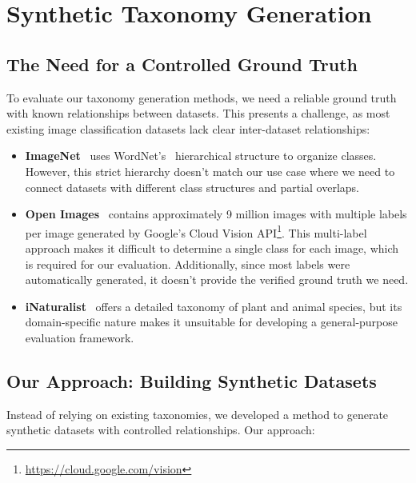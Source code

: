 \section{Synthetic Taxonomy Generation}

\subsection{The Need for a Controlled Ground Truth}

To evaluate our taxonomy generation methods, we need a reliable ground truth with known relationships between datasets. This presents a challenge, as most existing image classification datasets lack clear inter-dataset relationships:

\begin{itemize}
    \item \textbf{ImageNet}~\cite{deng_imagenet_2009,russakovsky_imagenet_2015}
          uses WordNet's~\cite{fellbaum_wordnet_1998} hierarchical structure to organize classes.
          However, this strict hierarchy doesn't match our use case where we need to connect
          datasets with different class structures and partial overlaps.

    \item \textbf{Open Images}~\cite{kuznetsova_open_2020} contains approximately 9 million
          images with multiple labels per image generated by Google's Cloud Vision API\footnote{\url{https://cloud.google.com/vision}}.
          This multi-label approach makes it difficult to determine a single class for each image,
          which is required for our evaluation. Additionally, since most labels were automatically
          generated, it doesn't provide the verified ground truth we need.

    \item \textbf{iNaturalist}~\cite{horn_inaturalist_2018} offers a detailed taxonomy of
          plant and animal species, but its domain-specific nature makes it unsuitable
          for developing a general-purpose evaluation framework.
\end{itemize}

\subsection{Our Approach: Building Synthetic Datasets}

Instead of relying on existing taxonomies, we developed a method to generate synthetic datasets with controlled relationships. Our approach:

